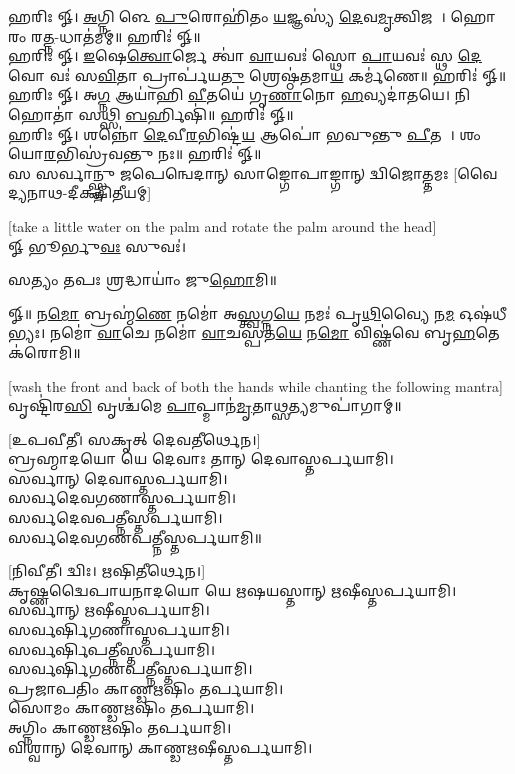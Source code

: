 𑌹𑌰𑌿𑌃 𑍐। \ul{𑌅}𑌗𑍍𑌨𑌿𑌮𑍀᳚𑌳𑍇 \ul{𑌪𑍁}𑌰𑍋𑌹𑌿॑𑌤𑌂 \ul{𑌯}𑌜𑍍𑌞𑌸𑍍𑌯॑ \ul{𑌦𑍇}𑌵\ul{𑌮𑍃}𑌤𑍍𑌵𑌿𑌜𑌮𑍍᳚। 𑌹𑍋𑌤𑌾᳚𑌰𑌂 𑌰\ul{𑌤𑍍𑌨}-𑌧𑌾𑌤॑𑌮𑌮𑍍॥ 𑌹𑌰𑌿𑌃॑ 𑍐॥\\

𑌹𑌰𑌿𑌃 𑍐। \ul{𑌇}𑌷𑍇\ul{𑌤𑍍𑌵𑍋}𑌰𑍍𑌜𑍇 𑌤𑍍𑌵𑌾॑ \ul{𑌵𑌾}𑌯𑌵𑌃॑ 𑌸𑍍𑌥𑍋 \ul{𑌪𑌾}𑌯𑌵𑌃॑ 𑌸𑍍𑌥 \ul{𑌦𑍇}𑌵𑍋 𑌵𑌃॑ 𑌸\ul{𑌵𑌿}𑌤𑌾 𑌪𑍍𑌰𑌾𑌰𑍍𑌪॑𑌯\ul{𑌤𑍁} 𑌶𑍍𑌰𑍇𑌷𑍍𑌠॑𑌤𑌮𑌾\ul{𑌯} 𑌕𑌰𑍍𑌮॑𑌣𑍇॥ 𑌹𑌰𑌿𑌃॑ 𑍐॥ \\

𑌹𑌰𑌿𑌃 𑍐। 𑌅\ul{𑌗𑍍𑌨} 𑌆𑌯𑌾॑𑌹𑌿 \ul{𑌵𑍀}𑌤𑌯𑍇॑ 𑌗𑍃\ul{𑌣𑌾}𑌨𑍋 \ul{𑌹}𑌵𑍍𑌯𑌦𑌾॑𑌤𑌯𑍇। 𑌨𑌿 𑌹𑍋𑌤𑌾॑ 𑌸𑌥𑍍𑌸𑌿 \ul{𑌬}𑌰𑍍𑌹𑌿𑌷𑌿॑॥ 𑌹𑌰𑌿𑌃॑ 𑍐॥\\

𑌹𑌰𑌿𑌃 𑍐। 𑌶𑌨𑍍𑌨𑍋॑ \ul{𑌦𑍇}𑌵𑍀\ul{𑌰}𑌭𑌿𑌷𑍍𑌟॑\ul{𑌯} 𑌆𑌪𑍋॑ 𑌭𑌵𑍁𑌨𑍍𑌤𑍁 \ul{𑌪𑍀}𑌤𑌯𑍇᳚। 𑌶𑌂 𑌯𑍋\ul{𑌰}𑌭𑌿𑌸𑍍𑌰॑𑌵𑌨𑍍𑌤𑍁 𑌨𑌃॥ 𑌹𑌰𑌿𑌃॑ 𑍐॥\\

{\centering
{}
{𑌸 𑌸𑌰𑍍𑌵𑌾𑌨𑍍𑌸𑍍𑌤𑍁 𑌜𑌪𑍇𑌨𑍍𑌵𑍇𑌦𑌾𑌨𑍍 𑌸𑌾𑌙𑍍𑌗𑍋𑌪𑌾𑌙𑍍𑌗𑌾𑌨𑍍 𑌦𑍍𑌵𑌿𑌜𑍋𑌤𑍍𑌤𑌮𑌃}
}
{\hfill [𑌵𑍈𑌦𑍍𑌯𑌨𑌾𑌥-𑌦𑍀𑌕𑍍𑌷𑌿𑌤𑍀𑌯𑌮𑍍]}

{\scriptsize [take a little water on the palm and rotate the palm around the head]}\\
𑍐 𑌭𑍂𑌰𑍍𑌭𑍁\ul{𑌵𑌃} 𑌸𑍁𑌵𑌃॑।

𑌸𑌤𑍍𑌯𑌂 𑌤𑌪𑌃 𑌶𑍍𑌰𑌦𑍍𑌧𑌾𑌯𑌾𑌂॑ 𑌜𑍁\ul{𑌹𑍋}𑌮𑌿॥


𑍐॥ 𑌨\ul{𑌮𑍋} 𑌬𑍍𑌰𑌹𑍍𑌮॑\ul{𑌣𑍇} 𑌨𑌮𑍋॑ 𑌅\ul{𑌸𑍍𑌤𑍍𑌵}𑌗𑍍𑌨\ul{𑌯𑍇} 𑌨𑌮𑌃॑ 𑌪𑍃\ul{𑌥𑌿}𑌵𑍍𑌯𑍈 𑌨\ul{𑌮} 𑌓𑌷॑𑌧𑍀𑌭𑍍𑌯𑌃।
𑌨𑌮𑍋॑ \ul{𑌵𑌾}𑌚𑍇 𑌨𑌮𑍋॑ \ul{𑌵𑌾}𑌚𑌸𑍍𑌪𑌤॑\ul{𑌯𑍇} 𑌨\ul{𑌮𑍋} 𑌵𑌿𑌷𑍍𑌣॑𑌵𑍇 𑌬𑍃\ul{𑌹}𑌤𑍇 𑌕॑𑌰𑍋𑌮𑌿॥

{\scriptsize [wash the front and back of both the hands while chanting the following mantra]}\\
𑌵𑍃𑌷𑍍𑌟𑌿॑𑌰\ul{𑌸𑌿} 𑌵𑍃𑌶𑍍𑌚॑𑌮𑍇 \ul{𑌪𑌾}𑌪𑍍𑌮𑌾𑌨॑\ul{𑌮𑍃}𑌤𑌾\ul{𑌥𑍍𑌸}𑌤𑍍𑌯𑌮𑍁𑌪𑌾॑𑌗𑌾𑌮𑍍॥

\vspace{-1ex}
{\scriptsize [𑌉𑌪𑌵𑍀𑌤𑍀। 𑌸𑌕𑍃𑌤𑍍 𑌦𑍇𑌵𑌤𑍀𑌰𑍍𑌥𑍇𑌨।]}\\
𑌬𑍍𑌰𑌹𑍍𑌮𑌾𑌦𑌯𑍋 𑌯𑍇 𑌦𑍇𑌵𑌾𑌃 𑌤𑌾𑌨𑍍 𑌦𑍇𑌵𑌾𑌸𑍍𑌤𑌰𑍍𑌪𑌯𑌾𑌮𑌿।\\
𑌸𑌰𑍍𑌵𑌾𑌨𑍍 𑌦𑍇𑌵𑌾𑌸𑍍𑌤𑌰𑍍𑌪𑌯𑌾𑌮𑌿।\\
𑌸𑌰𑍍𑌵𑌦𑍇𑌵𑌗𑌣𑌾𑌸𑍍𑌤𑌰𑍍𑌪𑌯𑌾𑌮𑌿।\\
𑌸𑌰𑍍𑌵𑌦𑍇𑌵𑌪𑌤𑍍𑌨𑍀𑌸𑍍𑌤𑌰𑍍𑌪𑌯𑌾𑌮𑌿।\\
𑌸𑌰𑍍𑌵𑌦𑍇𑌵𑌗𑌣𑌪𑌤𑍍𑌨𑍀𑌸𑍍𑌤𑌰𑍍𑌪𑌯𑌾𑌮𑌿॥

{\scriptsize [𑌨𑌿𑌵𑍀𑌤𑍀। 𑌦𑍍𑌵𑌿𑌃। 𑌋𑌷𑌿𑌤𑍀𑌰𑍍𑌥𑍇𑌨।]}\\
𑌕𑍃𑌷𑍍𑌣𑌦𑍍𑌵𑍈𑌪𑌾𑌯𑌨𑌾𑌦𑌯𑍋 𑌯𑍇 𑌋𑌷𑌯𑌸𑍍𑌤𑌾𑌨𑍍 𑌋𑌷𑍀𑌸𑍍𑌤𑌰𑍍𑌪𑌯𑌾𑌮𑌿।\\
𑌸𑌰𑍍𑌵𑌾𑌨𑍍 𑌋𑌷𑍀𑌸𑍍𑌤𑌰𑍍𑌪𑌯𑌾𑌮𑌿।\\
𑌸𑌰𑍍𑌵𑌰𑍍𑌷𑌿𑌗𑌣𑌾𑌸𑍍𑌤𑌰𑍍𑌪𑌯𑌾𑌮𑌿।\\
𑌸𑌰𑍍𑌵𑌰𑍍𑌷𑌿𑌪𑌤𑍍𑌨𑍀𑌸𑍍𑌤𑌰𑍍𑌪𑌯𑌾𑌮𑌿।\\
𑌸𑌰𑍍𑌵𑌰𑍍𑌷𑌿𑌗𑌣𑌪𑌤𑍍𑌨𑍀𑌸𑍍𑌤𑌰𑍍𑌪𑌯𑌾𑌮𑌿।\\
𑌪𑍍𑌰𑌜𑌾𑌪𑌤𑌿𑌂 𑌕𑌾𑌣𑍍𑌡𑌋𑌷𑌿𑌂 𑌤𑌰𑍍𑌪𑌯𑌾𑌮𑌿।\\
𑌸𑍋𑌮𑌂 𑌕𑌾𑌣𑍍𑌡𑌋𑌷𑌿𑌂 𑌤𑌰𑍍𑌪𑌯𑌾𑌮𑌿।\\
𑌅𑌗𑍍𑌨𑌿𑌂 𑌕𑌾𑌣𑍍𑌡𑌋𑌷𑌿𑌂 𑌤𑌰𑍍𑌪𑌯𑌾𑌮𑌿।\\
𑌵𑌿𑌶𑍍𑌵𑌾𑌨𑍍 𑌦𑍇𑌵𑌾𑌨𑍍 𑌕𑌾𑌣𑍍𑌡𑌋𑌷𑍀𑌸𑍍𑌤𑌰𑍍𑌪𑌯𑌾𑌮𑌿।
\pagebreak[4]

